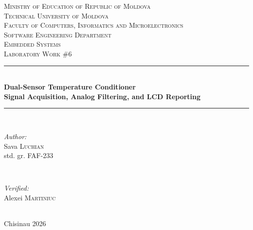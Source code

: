 \documentclass[12pt]{article}
\begin{document}
\begin{titlepage}
  \begin{center}
    \textsc{\large Ministry of Education of Republic of Moldova}\\[0.5cm]
    \textsc{\large Technical University of Moldova}\\[0.5cm]
    \textsc{\large Faculty of Computers, Informatics and Microelectronics}\\[0.5cm]
    \textsc{\large Software Engineering Department}\\[1.2cm]

    \vspace{20mm}
    \textsc{\Large Embedded Systems}\\[0.5cm]
    \textsc{\large Laboratory Work \#6}\\[0.5cm]

    \newcommand{\HRule}{\rule{\linewidth}{0.5mm}}
    \vspace{8mm}
    \HRule\\[0.4cm]
    {\LARGE \bfseries Dual-Sensor Temperature Conditioner\\[0.2cm]
    \large Signal Acquisition, Analog Filtering, and LCD Reporting\\[0.3cm]}
    \HRule\\[1.5cm]

    \begin{minipage}[t]{0.45\textwidth}
      \begin{flushleft}\large
        \emph{Author:}\\
        Sava \textsc{Luchian}\\
        std. gr. FAF-233
      \end{flushleft}
    \end{minipage}
    ~
    \begin{minipage}[t]{0.45\textwidth}
      \begin{flushright}\large
        \emph{Verified:}\\
        Alexei \textsc{Martiniuc}\\
      \end{flushright}
    \end{minipage}\\[2.5cm]

    \large Chisinau 2026
    \vfill
  \end{center}
\end{titlepage}

\setcounter{page}{2}
\pagestyle{fancy}
\fancyhf{}
\rhead{\thepage}
\end{document}
